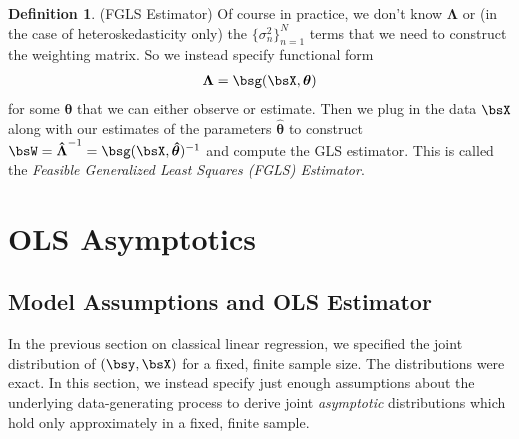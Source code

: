 \documentclass[12pt]{article}
\theoremstyle{plain}
\theoremstyle{definition}
\newtheorem{defn}[thm]{Definition}
\theoremstyle{remark}
\newcommand{\bstheta}{\boldsymbol{\theta}}
\newcommand{\bsLambda}{\boldsymbol{\Lambda}}
\newcommand{\bshatLambda}{\boldsymbol{\hat{\Lambda}}}
\newcommand{\bshattheta}{\boldsymbol{\hat{\theta}}}
\newcommand{\nN}{_{n=1}^N}
\begin{document}
\begin{defn}(FGLS Estimator)
Of course in practice, we don't know $\bsLambda$ or (in the case of
heteroskedasticity only) the $\{\sigma_n^2\}\nN$ terms that we need to
construct the weighting matrix. So we instead specify functional form
\begin{align*}
  \bsLambda = \bsg(\bsX,\bstheta)
\end{align*}
for some $\bstheta$ that we can either observe or estimate.
Then we plug in the data $\bsX$ along with our estimates of
the parameters $\bshattheta$ to construct
$\bsW=\bshatLambda^{-1}=\bsg(\bsX,\bshattheta)^{-1}$ and compute the GLS
estimator. This is called the \emph{Feasible Generalized Least Squares
(FGLS) Estimator}.
\end{defn}


\clearpage
\section{OLS Asymptotics}


\subsection{Model Assumptions and OLS Estimator}

In the previous section on classical linear regression, we specified the
joint distribution of $(\bsy,\bsX)$ for a fixed, finite sample size. The
distributions were exact.
In this section, we instead specify just enough assumptions about the
underlying data-generating process to derive joint
\emph{asymptotic} distributions which hold only approximately in a
fixed, finite sample.
\end{document}
